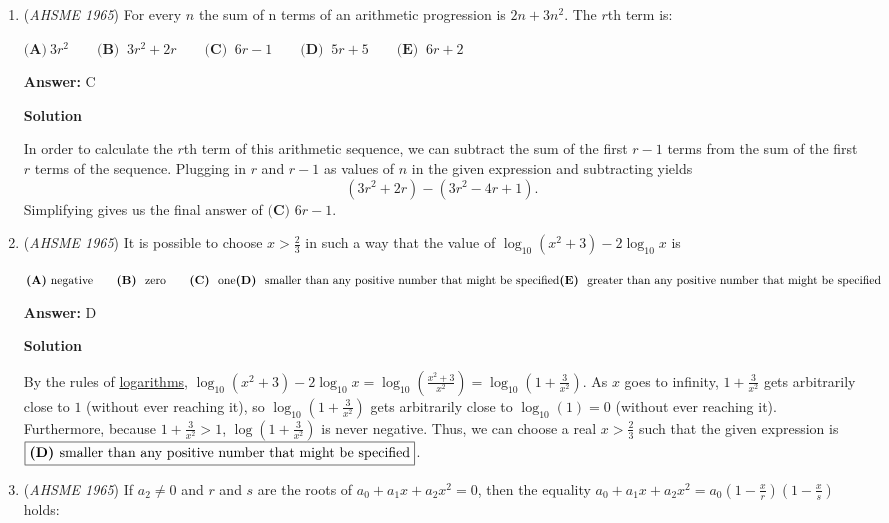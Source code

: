 \begin{enumerate}
	\item (\textit{AHSME 1965}) For every $n$ the sum of n terms of an arithmetic progression is $2n + 3n^2$. The $r$th term is: 


 $\textbf{(A)}\ 3r^2 \qquad  \textbf{(B) }\ 3r^2 + 2r \qquad  \textbf{(C) }\ 6r - 1 \qquad  \textbf{(D) }\ 5r + 5 \qquad  \textbf{(E) }\ 6r+2\qquad$

 \textbf{Answer: }C



\textbf{Solution}

In order to calculate the $r$th term of this arithmetic sequence, we can subtract the sum of the first $r-1$ terms from the sum of the first $r$ terms of the sequence. Plugging in $r$ and $r-1$ as values of $n$ in the given expression and subtracting yields 
 \[(3r^2+2r)-(3r^2-4r+1).\] Simplifying gives us the final answer of $\boxed{\textbf{(C) }6r-1}$.

 


	\item (\textit{AHSME 1965}) It is possible to choose $x > \frac {2}{3}$ in such a way that the value of $\log_{10}(x^2 + 3) - 2 \log_{10}x$ is 


 $\textbf{(A)}\ \text{negative} \qquad  \textbf{(B) }\ \text{zero} \qquad  \textbf{(C) }\ \text{one} \\ \textbf{(D) }\ \text{smaller than any positive number that might be specified} \\ \textbf{(E) }\ \text{greater than any positive number that might be specified}$

 \textbf{Answer: }D



\textbf{Solution}

By the rules of \href{https://artofproblemsolving.com/wiki/index.php?title=Logarithms}{logarithms}, $\log_{10}(x^2+3)-2\log_{10} x=\log_{10}(\frac{x^2+3}{x^2})=\log_{10}(1+\frac{3}{x^2})$. As $x$ goes to infinity, $1+\frac{3}{x^2}$ gets arbitrarily close to $1$ (without ever reaching it), so $\log_{10}(1+\frac{3}{x^2})$ gets arbitrarily close to $\log_{10}(1)=0$ (without ever reaching it). Furthermore, because $1+\frac3{x^2} > 1$, $\log(1+\frac3{x^2})$ is never negative. Thus, we can choose a real $x>\frac{2}{3}$ such that the given expression is $\fbox{\textbf{(D) }smaller than any positive number that might be specified}$.

 


	\item (\textit{AHSME 1965}) If $a_2 \neq 0$ and $r$ and $s$ are the roots of $a_0 + a_1x + a_2x^2 = 0$, then the equality 
$a_0 + a_1x + a_2x^2 = a_0\left (1 - \frac {x}{r} \right ) \left (1 - \frac {x}{s} \right )$ holds: 



\end{enumerate}

